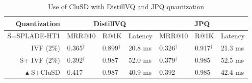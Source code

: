 \begin{table}[htbp]
        \centering
        \caption{ Use of CluSD with   DistillVQ and JPQ quantization}
                \begin{tabular}{ r |l l l |ll l}
                        \hline\hline
                Quantization & \multicolumn{3}{c|}{\bf{DistillVQ}} & \multicolumn{3}{c}{\bf{JPQ}}   \\
                        \hline
S=SPLADE-HT1                        & {MRR@10} & {R@1K}  & {Latency } & {MRR@10} & {R@1K}    & {Latency}\\
                        \hline
                        IVF (2\%)  & 0.365$^\dag$ &	0.899$^\dag$ &	20.8 ms
& 0.326$^\dag$	&0.917$^\dag$ &	21.3 ms\\
S+ IVF (2\%)	&0.392$^\dag$ &	0.987&	52.0 ms
& 0.379$^\dag$ & 	0.985& 	52.5 ms\\
$\blacktriangle$ S+CluSD&	 0.417 &	0.987 &	40.9 ms
 &0.392 &	0.985 &	42.4 ms\\
\hline           
\hline           
                \end{tabular}%
\vspace*{-5mm}  
        \label{tab:compress}
\end{table}     


